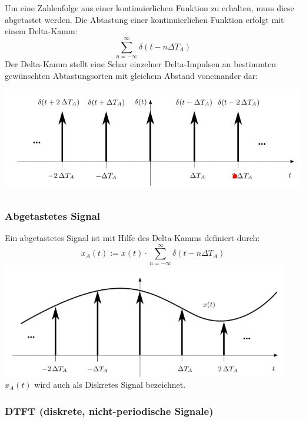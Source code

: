 \documentclass[12pt,a4paper]{scrartcl}
\begin{document}
\noindent Um eine Zahlenfolge aus einer kontinuierlichen Funktion zu erhalten, muss diese abgetastet werden. 
Die Abtastung einer kontinuierlichen Funktion erfolgt mit einem Delta-Kamm:
  \begin{equation}
    \label{eq:11}
      \sum_{n = -\infty}^{\infty} \delta (t-n\Delta T_A)
  \end{equation}
\noindent Der Delta-Kamm stellt eine Schar einzelner Delta-Impulsen an bestimmten gewünschten Abtastungsorten mit gleichem Abstand voneinander dar: \\
\includegraphics[height=5cm]{Pictures/DeltaKamm.png}

\subsubsection{Abgetastetes Signal}
  \label{sec.sub:sub:abgetastetes-signal}
\noindent Ein abgetastetes Signal ist mit Hilfe des Delta-Kamms definiert durch:
\begin{equation}
  \label{eq:12}
    x_A(t) := x(t) \cdot \sum_{n = -\infty}^{\infty} \delta (t-n\Delta T_A)
\end{equation} 
\includegraphics[height=5cm]{Pictures/AbgetastetSignal.png} \\
\noindent $x_A(t)$ wird auch als Diskretes Signal bezeichnet.

\subsubsection{DTFT (diskrete, nicht-periodische Signale)}
  \label{sec.sub:sub:dtft}
\end{document}

